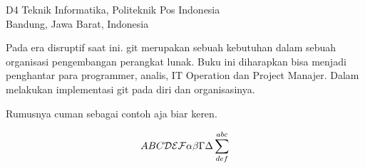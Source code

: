

{D4 Teknik Informatika, Politeknik Pos Indonesia\\
Bandung, Jawa Barat, Indonesia}

Pada era disruptif   
saat ini. git merupakan sebuah kebutuhan dalam sebuah organisasi pengembangan perangkat lunak.
Buku ini diharapkan bisa menjadi penghantar para programmer, analis, IT Operation dan Project Manajer.
Dalam melakukan implementasi git pada diri dan organisasinya.

Rumusnya cuman sebagai contoh aja biar keren\cite{awangga2018sampeu}.

\begin{equation}
ABC {\cal DEF} \alpha\beta\Gamma\Delta\sum^{abc}_{def}
\end{equation}
